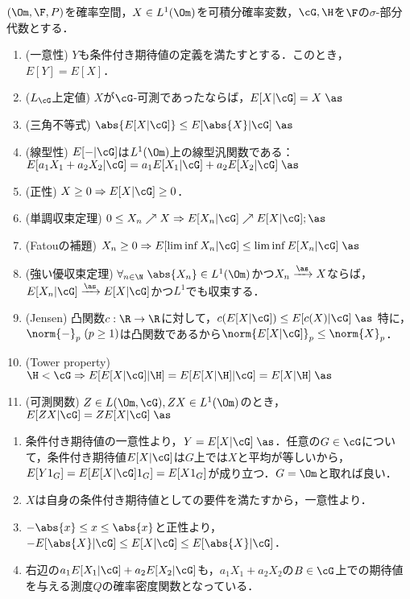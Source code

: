 \documentclass[uplatex,dvipdfmx]{jsreport}
\begin{document}
\begin{proposition}
    $(\Om,\F,P)$を確率空間，$X\in L^1(\Om)$を可積分確率変数，$\cG,\H$を$\F$の$\sigma$-部分代数とする．
    \begin{enumerate}
        \item (一意性) $Y$も条件付き期待値の定義を満たすとする．このとき，$E[Y]=E[X]$．
        \item ($L_\cG$上定値) $X$が$\cG$-可測であったならば，$E[X|\cG]=X\;\as$
        \item (三角不等式) $\abs{E[X|\cG]}\le E[\abs{X}|\cG]\;\as$
        \item (線型性) $E[-|\cG]$は$L^1(\Om)$上の線型汎関数である：$E[a_1X_1+a_2X_2|\cG]=a_1E[X_1|\cG]+a_2E[X_2|\cG]\;\as$
        \item (正性) $X\ge0\Rightarrow E[X|\cG]\ge0$．
        \item (単調収束定理) $0\le X_n\nearrow X\Rightarrow E[X_n|\cG]\nearrow E[X|\cG];\as$
        \item (Fatouの補題) $X_n\ge0\Rightarrow E[\liminf X_n|\cG]\le\liminf E[X_n|\cG]\;\as$
        \item (強い優収束定理) $\forall_{n\in\N}\;\abs{X_n}\in L^1(\Om)$かつ$X_n\xrightarrow{\as}X$ならば，$E[X_n|\cG]\xrightarrow{\as}E[X|\cG]$かつ$L^1$でも収束する．
        \item (Jensen) 凸関数$c:\R\to\R$に対して，$c(E[X|\cG])\le E[c(X)|\cG]\;\as$ 特に，$\norm{-}_p\;(p\ge1)$は凸関数であるから$\norm{E[X|\cG]}_p\le\norm{X}_p$．
        \item (Tower property) $\H<\cG\Rightarrow E[E[X|\cG]|\H]=E[E[X|\H]|\cG]=E[X|\H]\;\as$
        \item (可測関数) $Z\in L(\Om,\cG),ZX\in L^1(\Om)$のとき，$E[ZX|\cG]=ZE[X|\cG]\;\as$
    \end{enumerate}
\end{proposition}
\begin{Proof}\mbox{}
    \begin{enumerate}
        \item 条件付き期待値の一意性より，$Y=E[X|\cG]\;\as$．任意の$G\in\cG$について，条件付き期待値$E[X|\cG]$は$G$上では$X$と平均が等しいから，
        $E[Y1_G]=E[E[X|\cG]1_G]=E[X1_G]$が成り立つ．$G=\Om$と取れば良い．
        \item $X$は自身の条件付き期待値としての要件を満たすから，一意性より．
        \item $-\abs{x}\le x\le\abs{x}$と正性より，$-E[\abs{X}|\cG]\le E[X|\cG]\le E[\abs{X}|\cG]$．
        \item 右辺の$a_1E[X_1|\cG]+a_2E[X_2|\cG]$も，$a_1X_1+a_2X_2$の$B\in\cG$上での期待値を与える測度$Q$の確率密度関数となっている．
    \end{enumerate}
\end{Proof}
\end{document}
